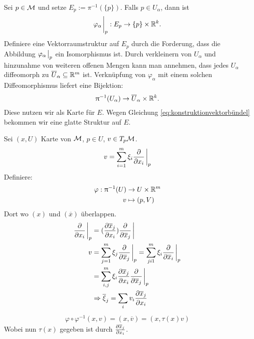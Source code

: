 \begin{bew}
Sei  $p\in\mathcal{M}$ und setze $E_p := \pi^{-1}(\{ p \})$. 
Falls $p\in U_\alpha$, dann ist 
\begin{align}
\varphi_\alpha \eval_p : E_p \to \{ p \} \times \R^k.
\end{align}
Definiere eine Vektorraumstruktur auf $E_p$ durch die Forderung, dass die Abbildung $\varphi_\alpha \eval_p$ ein Isomorphismus ist.
Durch verkleinern von $U_\alpha$ und hinzunahme von weiteren offenen Mengen kann man annehmen, dass jedes $U_\alpha$ diffeomorph zu $\overline{U}_\alpha \subseteq \mathbb{R}^m$ ist.
Verknüpfung von $\varphi_\alpha$ mit einem solchen Diffeomorphismus liefert eine Bijektion:
\begin{align}
\uppi^{-1} (U_\alpha) \to \overline{U}_\alpha \times \mathbb{R}^k .
\end{align}
Diese nutzen wir als Karte für $E$.
Wegen Gleichung \ref{eq:konstruktionvektorbündel} bekommen wir eine glatte Struktur auf $E$.
\end{bew}
Sei $(x, U)$ Karte von $\mathcal{M}$, $p\in U$, $v\in T_p \mathcal{M}$.
\begin{align}
v = \sum_{i=1}^{m} \xi_i \pdv{x_i}\eval_p
\end{align}
Definiere:
\begin{align}
\varphi: \uppi^{-1} (U) &\to U \times \mathbb{R}^m\\
v &\mapsto (p, V)
\end{align}
Dort wo $(x)$ und $(\overline{x})$ überlappen.
\begin{align}
\pdv{x_i} \eval_p &= (\pdv{\overline{x}_j}{x_i})\pdv{\overline{x}_j} \eval\\
v &= \sum_{j=1}^{m} \xi_j \pdv{\overline{x}_j}  \eval_p = \sum_{ji1}^{m} \xi_i \pdv{\overline{x}_i}  \eval_p \\
&= \sum_{i, j}^{m} \xi_i \pdv{\overline{x}_j}{x_i}  \pdv{\overline{x}_j}\eval_p\\
&\Rightarrow \overline{\xi}_j = \sum_i v_i \pdv{\overline{x}_j}{x_i}
\end{align}
\begin{align}
\varphi \circ \varphi^{-1}(x, v) = (x, \overline{v}) = (x, \tau(x) v)
\end{align}
Wobei nun $\tau(x)$ gegeben ist durch $\pdv{\overline{x}_j}{x_i}$.\\